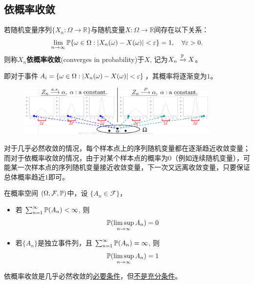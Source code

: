 \subsection{依概率收敛}

\begin{definition}[依概率收敛]
    若随机变量序列$\{ X_n: \Omega \to \mathbb{R} \}$与随机变量$X:\Omega \to \mathbb{R}$间存在以下关系：
    \[ \lim_{n\to\infty}\P\{\omega \in \Omega: \abs{X_n(\omega) - X(\omega)}<\e\} = 1, \quad \forall \e>0. \]
    则称$X_n$\textbf{依概率收敛}(converges in probability)于$X$, 记为$X_n \xrightarrow{\P} X$。
\end{definition}
\begin{remark}
    即对于事件$A_i=\{\omega \in \Omega: \abs{X_n(\omega) - X(\omega)}<\e\}$，其概率将逐渐变为$1$。
\end{remark}

\begin{figure}[h]
    \centering
    \includegraphics[width=0.9\textwidth]{image/converge1.png}
\end{figure}

对于几乎必然收敛的情况，每个样本点上的序列随机变量都在逐渐趋近收敛变量；而对于依概率收敛的情况，由于对某个样本点的概率为0（例如连续随机变量），可能某一次样本点的序列随机变量接近收敛变量，下一次又远离收敛变量，只要保证总体概率趋近$1$即可。

\begin{theorem}
    在概率空间 $(\Omega,\mathcal{F},\P)$中，设 $\{ A_n \in \mathcal{F} \}$，
    \begin{itemize}
        \item 若 $\sum_{n=1}^{\infty} \P(A_n) < \infty$, 则
        \[ \P(\limsup_{n \to \infty}A_n) = 0\]
        \item 若$\{ A_n \}$是独立事件列，且 $\sum_{n=1}^{\infty} \P(A_n) = \infty$, 则
        \[ \P(\limsup_{n \to \infty}A_n) = 1\]
    \end{itemize}
\end{theorem}

\begin{proposition}
    依概率收敛是几乎必然收敛的\underline{必要条件}，但\underline{不是充分条件}。
\end{proposition}


